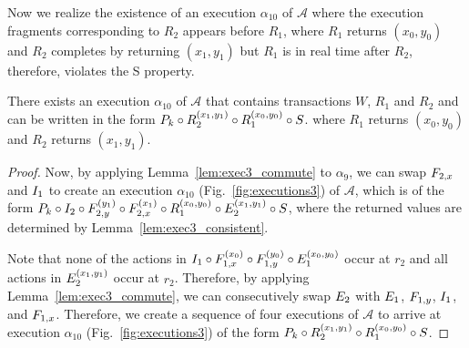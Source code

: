 
Now we realize the existence of an execution $\alpha_{10}$  of $\mathcal{A}$ where the execution fragments corresponding to $R_2$ appears 
before $R_1$, where  $R_1$ returns $(x_0, y_0)$ and $R_2$ completes by returning $(x_1, y_1)$
but $R_1$ is in real time after $R_2$, therefore, violates the S property.
\begin{lemma}   \label{lem:exec3_alpha11} 
\sloppy There exists an execution $\alpha_{10}$  of $\mathcal{A}$ that contains transactions $W$, $R_1$ and $R_2$
and   can be written in the form 
$\finiteprefixA{k-1}{k}   \circ
\frage{R_2}{}{x_1, y_1} \circ
 \frage{R_1}{}{x_0, y_0}
 \circ \fragt{S}{\alpha_{10}}{}$.
where $R_1$ returns $(x_0, y_0)$ and $R_2$ returns $(x_1, y_1)$.
\end{lemma}
\begin{proof}
Now, by applying Lemma~\ref{lem:exec3_commute} to $\alpha_{9}$, we can swap 
 $\fragt{F_{2,x}}{}{}$  and $ \fragt{I_1}{}{}$ to create an execution $\alpha_{10}$  (Fig.~\ref{fig:executions3}) of $\mathcal{A}$, which is
of the form 
$ \finiteprefixA{k-1}{k}   \circ 
\fragt{I_2}{\alpha_9}{} \circ \fragt{F_{2,y}}{\alpha_9}{y_1} 
\circ   \fragt{F_{2,x}}{\alpha_9}{x_1}  \circ 
\frage{R_1}{}{x_0, y_0} \circ \fragt{E_2}{\alpha_8}{x_1, y_1}
 \circ \fragt{S}{\alpha_9}{}$, where the returned values are determined by  Lemma~\ref{lem:exec3_consistent}.
 
Note that none of the actions in 
$\fragt{I_1}{\alpha_9}{} \circ \fragt{F_{1,x}}{\alpha_9}{x_0} 
 \circ \fragt{F_{1,y}}{\alpha_9}{y_0} \circ \fragt{E_1}{\alpha_9}{x_0, y_0}$
occur at $r_2$ and all actions in $\fragt{E_2}{\alpha_9}{x_1, y_1} $ occur at $r_2$. Therefore, by 
applying Lemma~\ref{lem:exec3_commute}, we can consecutively swap $\fragt{E_2}{}{}$ with 
%
$\fragt{E_1}{}{}$, $\fragt{F_{1,y}}{}{}$,  $\fragt{I_1}{}{}$,  and $\fragt{F_{1,x}}{}{}$. Therefore, we create a sequence of 
four executions of $\mathcal{A}$ to arrive at execution $\alpha_{10}$ (Fig.~\ref{fig:executions3}) of the form
$\finiteprefixA{k-1}{k}   \circ
\frage{R_2}{}{x_1, y_1}
 \circ
 \frage{R_1}{}{x_0, y_0}
 \circ \fragt{S}{\alpha_{10}}{}$.
\end{proof}
